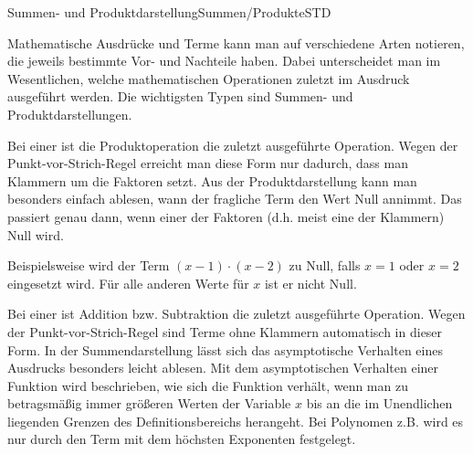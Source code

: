 \begin{MXContent}{Summen- und Produktdarstellung}{Summen/Produkte}{STD}

% 


Mathematische Ausdrücke und Terme kann man auf verschiedene Arten notieren, die jeweils bestimmte Vor- und Nachteile haben. Dabei unterscheidet man im Wesentlichen,
welche mathematischen Operationen zuletzt im Ausdruck ausgeführt werden. Die wichtigsten Typen sind Summen- und Produktdarstellungen.

\begin{MInfo}
Bei einer  ist die Produktoperation die zuletzt ausgeführte Operation. Wegen der Punkt-vor-Strich-Regel erreicht man diese Form nur dadurch,
dass man Klammern um die Faktoren setzt. Aus der Produktdarstellung kann man besonders einfach ablesen, wann der fragliche Term den Wert Null annimmt. Das passiert genau dann, wenn
einer der Faktoren (d.h. meist eine der Klammern) Null wird.
\end{MInfo}

Beispielsweise wird der Term $(x-1)\cdot (x-2)$ zu Null, falls $x=1$ oder $x=2$ eingesetzt wird. Für alle anderen Werte für $x$ ist er nicht Null. 

\begin{MInfo}
Bei einer  ist Addition bzw. Subtraktion die zuletzt ausgeführte Operation. Wegen der Punkt-vor-Strich-Regel sind Terme ohne Klammern
automatisch in dieser Form. In der Summendarstellung lässt sich das asymptotische Verhalten eines Ausdrucks besonders leicht ablesen.
Mit dem asymptotischen Verhalten einer Funktion wird beschrieben, wie sich
die Funktion verhält, wenn man zu betragsmäßig immer größeren Werten der
Variable $x$ bis an die im Unendlichen liegenden Grenzen des
Definitionsbereichs herangeht.
Bei Polynomen z.B. wird es nur durch den
Term mit dem höchsten Exponenten festgelegt.
\end{MInfo}


\end{MXContent}

